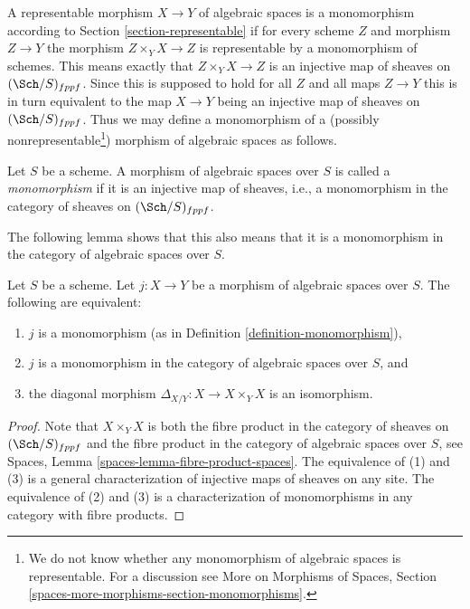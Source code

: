 \noindent
A representable morphism $X \to Y$ of algebraic spaces is a monomorphism
according to Section \ref{section-representable} if for every scheme
$Z$ and morphism $Z \to Y$ the morphism $Z \times_Y X \to Z$
is representable by a monomorphism of schemes.
This means exactly that $Z \times_Y X \to Z$
is an injective map of sheaves on $(\Sch/S)_{fppf}$. Since this
is supposed to hold for all $Z$ and all maps $Z \to Y$ this is in turn
equivalent to the map $X \to Y$ being an injective map of sheaves on
$(\Sch/S)_{fppf}$. Thus we may define a monomorphism of a (possibly
nonrepresentable\footnote{We do not know whether any monomorphism
of algebraic spaces is representable. For a discussion see
More on Morphisms of Spaces, Section
\ref{spaces-more-morphisms-section-monomorphisms}.})
morphism of algebraic spaces as follows.

\begin{definition}
\label{definition-monomorphism}
Let $S$ be a scheme.
A morphism of algebraic spaces over $S$ is called a {\it monomorphism}
if it is an injective map of sheaves, i.e., a monomorphism in the category
of sheaves on $(\Sch/S)_{fppf}$.
\end{definition}

\noindent
The following lemma shows that this also means that it is a monomorphism
in the category of algebraic spaces over $S$.

\begin{lemma}
\label{lemma-monomorphism}
Let $S$ be a scheme.
Let $j : X \to Y$ be a morphism of algebraic spaces over $S$.
The following are equivalent:
\begin{enumerate}
\item $j$ is a monomorphism (as in Definition \ref{definition-monomorphism}),
\item $j$ is a monomorphism in the category of algebraic spaces over $S$, and
\item the diagonal morphism $\Delta_{X/Y} : X \to X \times_Y X$ is
an isomorphism.
\end{enumerate}
\end{lemma}

\begin{proof}
Note that $X \times_Y X$ is both the fibre product in the category of
sheaves on $(\Sch/S)_{fppf}$ and the fibre product in the category
of algebraic spaces over $S$, see
Spaces, Lemma \ref{spaces-lemma-fibre-product-spaces}.
The equivalence of (1) and (3) is a general characterization
of injective maps of sheaves on any site.
The equivalence of (2) and (3) is a characterization of monomorphisms
in any category with fibre products.
\end{proof}

